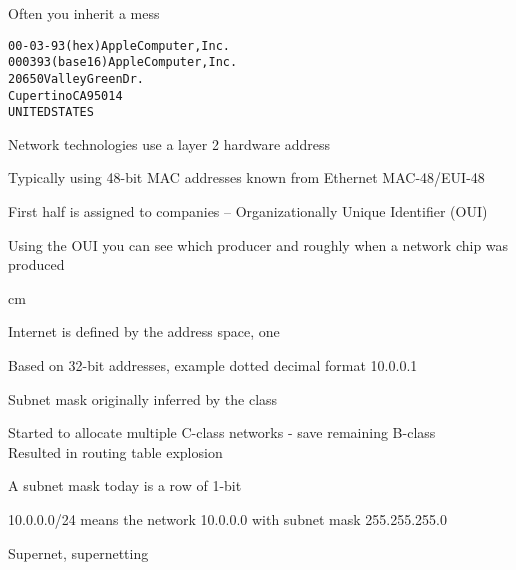 \documentclass[Screen16to9,17pt]{foils}
\begin{document}

\centerline{Often you inherit a mess}






\begin{alltt}
00-03-93   (hex)        Apple Computer, Inc.
000393     (base 16)    Apple Computer, Inc.
                        20650 Valley Green Dr.
                        Cupertino CA 95014
                        UNITED STATES
\end{alltt}
\begin{list1}
\item Network technologies use a layer 2 hardware address
\item Typically using 48-bit MAC addresses known from Ethernet MAC-48/EUI-48
\item First half is assigned to companies -- Organizationally Unique Identifier (OUI)
\item Using the OUI you can see which producer and roughly when a network chip was produced
\item {}
\end{list1}



 cm

\begin{list2}
\item Internet is defined by the address space, one
\item Based on 32-bit addresses, example dotted decimal format 10.0.0.1
\end{list2}




\begin{list2}
\item Subnet mask originally inferred by the class
\item Started to allocate multiple C-class networks - save remaining B-class\\
Resulted in routing table explosion
\item A subnet mask today is a row of 1-bit
\item 10.0.0.0/24 means the network 10.0.0.0 with subnet mask 255.255.255.0
\item Supernet, supernetting
\end{list2}
\end{document}
